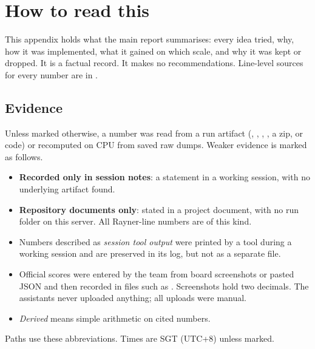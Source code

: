 
\section{How to read this}
\label{sec:read}

This appendix holds what the main report summarises: every idea tried, why, how it was implemented, what it gained on which scale, and why it was kept or dropped. It is a factual record. It makes no recommendations. Line-level sources for every number are in .

\subsection{Evidence}

Unless marked otherwise, a number was read from a run artifact (, , , , a zip, or code) or recomputed on CPU from saved raw dumps. Weaker evidence is marked as follows.

\begin{itemize}\setlength{\itemsep}{1pt}
\item \sn{} \textbf{Recorded only in session notes}: a statement in a working session, with no underlying artifact found.
\item \dc{} \textbf{Repository documents only}: stated in a project document, with no run folder on this server. All Rayner-line numbers are of this kind.
\item Numbers described as \emph{session tool output} were printed by a tool during a working session and are preserved in its log, but not as a separate file.
\item Official scores were entered by the team from board screenshots or pasted JSON and then recorded in files such as . Screenshots hold two decimals. The assistants never uploaded anything; all uploads were manual.
\item \emph{Derived} means simple arithmetic on cited numbers.
\end{itemize}

Paths use these abbreviations. Times are SGT (UTC+8) unless marked.

